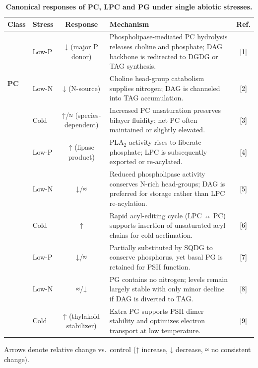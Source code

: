 \documentclass[10pt,letterpaper]{article}
\begin{document}
\begin{table}[!ht]
  \centering
  \caption{\bf Canonical responses of PC, LPC and PG under single abiotic stresses.}
  \label{table:lipid_responses}
  \begin{tabular}{@{} l l c p{5.5cm} c @{}}
    \toprule
    \textbf{Class} 
      & \textbf{Stress} 
      & \textbf{Response} 
      & \textbf{Mechanism} 
      & \textbf{Ref.} \\
    \midrule
    \multirow{3}{*}{\textbf{PC}} 
      & Low-P  & ↓ (major P donor)      
               & Phospholipase-mediated PC hydrolysis releases choline and phosphate; DAG backbone is redirected to DGDG or TAG synthesis. 
               & [1] \\
      & Low-N  & ↓ (N-source)          
               & Choline head-group catabolism supplies nitrogen; DAG is channeled into TAG accumulation. 
               & [2] \\
      & Cold   & ↑/≈ (species‐dependent) 
               & Increased PC unsaturation preserves bilayer fluidity; net PC often maintained or slightly elevated. 
               & [3] \\
    \addlinespace
    \multirow{3}{*}{\textbf{LPC}} 
      & Low-P  & ↑ (lipase product)    
               & PLA$_2$ activity rises to liberate phosphate; LPC is subsequently exported or re-acylated. 
               & [4] \\
      & Low-N  & ↓/≈                   
               & Reduced phospholipase activity conserves N-rich head-groups; DAG is preferred for storage rather than LPC re-acylation. 
               & [5] \\
      & Cold   & ↑                      
               & Rapid acyl-editing cycle (LPC ↔ PC) supports insertion of unsaturated acyl chains for cold acclimation. 
               & [6] \\
    \addlinespace
    \multirow{3}{*}{\textbf{PG}} 
      & Low-P  & ↓/≈                   
               & Partially substituted by SQDG to conserve phosphorus, yet basal PG is retained for PSII function. 
               & [7] \\
      & Low-N  & ≈/↓                   
               & PG contains no nitrogen; levels remain largely stable with only minor decline if DAG is diverted to TAG. 
               & [8] \\
      & Cold   & ↑ (thylakoid stabilizer)
               & Extra PG supports PSII dimer stability and optimizes electron transport at low temperature. 
               & [9] \\
    \bottomrule
  \end{tabular}
  \begin{flushleft}
    {\footnotesize Arrows denote relative change vs.\ control (↑ increase, ↓ decrease, ≈ no consistent change).}
  \end{flushleft}
\end{table}
\end{document}
